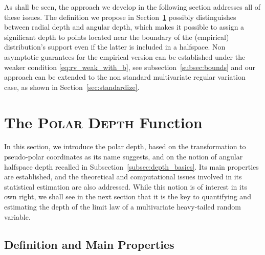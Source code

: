 \documentclass{article}
\numberwithin{equation}{section}
\begin{document}
As shall be seen, the approach we develop in the following section
addresses all of these issues. The definition we propose in Section~\ref{sec:Polar} possibly distinguishes between radial depth and
angular depth, which makes it possible to assign a significant depth
to points located near the boundary of the (empirical) distribution's
support even if the latter is included in a halfspace. Non
asymptotic guarantees for the empirical version can be established
under the weaker condition \eqref{eq:rv_weak_with_b}, see subsection~\ref{subsec:bounds} and our approach can be extended to the non
standard multivariate regular variation case, as shown in Section~\ref{sec:standardize}.

\section{The \textsc{Polar Depth} Function}\label{sec:Polar}
%

In this section, we introduce the polar depth, based 
on the transformation to pseudo-polar coordinates as its name suggests, and
on the notion of angular halfspace depth recalled in Subsection~\ref{subsec:depth_basics}. Its main properties are established, and
the theoretical and computational issues involved in its
statistical estimation are also addressed. While this notion is of
interest in its own right, we shall see in the next section that it
is the key to quantifying and estimating the depth of the limit law
of a multivariate heavy-tailed random variable.


\subsection{Definition and Main Properties}\label{subsec:polar_def}
%
\end{document}
